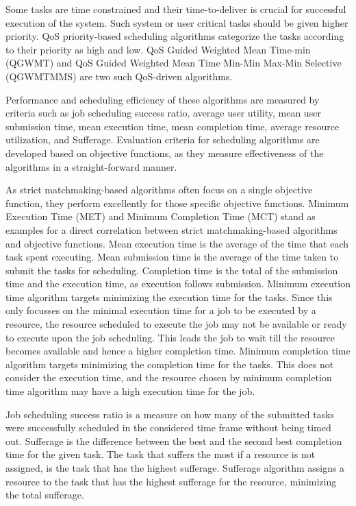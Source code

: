\documentclass[times, 10pt,twocolumn]{article}
\begin{document}
Some tasks are time constrained and their time-to-deliver is crucial for successful execution of the system. Such system or user critical tasks should be given higher priority. QoS priority-based scheduling algorithms categorize the tasks according to their priority as high and low. QoS Guided Weighted Mean Time-min (QGWMT) and QoS Guided Weighted Mean Time Min-Min Max-Min Selective (QGWMTMMS) are two such QoS-driven algorithms\cite{qosgrid}. 

Performance and scheduling efficiency of these algorithms are measured by criteria such as job scheduling success ratio, average user utility, mean user submission time, mean execution time, mean completion time, average resource utilization, and Sufferage. Evaluation criteria for scheduling algorithms are developed based on objective functions, as they measure effectiveness of the algorithms in a straight-forward manner. 

As strict matchmaking-based algorithms often focus on a single objective function, they perform excellently for those specific objective functions. Minimum Execution Time (MET) and Minimum Completion Time (MCT) stand as examples for a direct correlation between strict matchmaking-based algorithms and objective functions. Mean execution time is the average of the time that each task spent executing. Mean submission time is the average of the time taken to submit the tasks for scheduling. Completion time is the total of the submission time and the execution time, as execution follows submission. Minimum execution time algorithm targets minimizing the execution time for the tasks. Since this only focusses on the minimal execution time for a job to be executed by a resource, the resource scheduled to execute the job may not be available or ready to execute upon the job scheduling\cite{mahes}. This leads the job to wait till the resource becomes available and hence a higher completion time. Minimum completion time algorithm targets minimizing the completion time for the tasks. This does not consider the execution time, and the resource chosen by minimum completion time algorithm may have a high execution time for the job\cite{mahes}.

Job scheduling success ratio is a measure on how many of the submitted tasks were successfully scheduled in the considered time frame without being timed out. Sufferage is the difference between the best and the second best completion time for the given task\cite{sufferage}. The task that suffers the most if a resource is not assigned, is the task that has the highest sufferage. Sufferage algorithm assigns a resource to the task that has the highest sufferage for the resource, minimizing the total sufferage.
\end{document}
